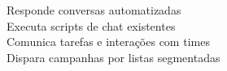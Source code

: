  Responde conversas automatizadas\\
 Executa scripts de chat existentes\\
 Comunica tarefas e interações com times\\
 Dispara campanhas por listas segmentadas\\
